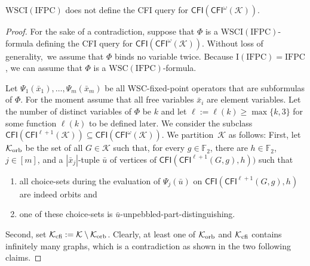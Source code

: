\documentclass[]{lmcs}
\newcommand{\FF}{\mathbb{F}}
\newcommand{\set}[1]{\lbrace #1 \rbrace}
\newcommand{\formA}{\Phi}
\newcommand{\formB}{\Psi}
\newcommand{\tup}[1]{\bar{#1}}
\newcommand{\vertA}{u}
\newcommand{\GraphClass}{\mathcal{K}}
\newcommand{\IFPC}{\ensuremath{\mathrm{IFPC}}}
\newcommand{\CFImsym}{\mathsf{CFI}^\omega}
\newcommand{\CFIm}[1]{\CFImsym(#1)}
\newcommand{\CFImk}[2]{\mathsf{CFI}^{#1}(#2)}
\newcommand{\WSCof}[1]{\mathrm{WSC}(#1)}
\newcommand{\Iof}[1]{\mathrm{I}(#1)}
\newcommand{\WSCIof}[1]{\mathrm{WSCI}(#1)}
\newcommand{\CFIsym}{\mathsf{CFI}}
\newcommand{\CFI}[1]{\CFIsym(#1)}
\begin{document}
\begin{lem}
	\label{lem:cfi-cfi-not-in-wsci}
	$\WSCIof{\IFPC}$ does not define the CFI query for $\CFI{\CFIm{\GraphClass}}$.
\end{lem}
\begin{proof}	
	For the sake of a contradiction, suppose that $\formA$ is a $\WSCIof{\IFPC}$-formula defining the CFI query for $\CFI{\CFIm{\GraphClass}}$.
	Without loss of generality,~we assume that $\formA$ binds no variable twice.
	Because $\Iof{\IFPC{}}=\IFPC{}$,
	we can assume that $\formA$ is a $\WSCof{\IFPC{}}$-formula.
	
	Let $\formB_1(\tup{x}_1), \dots, \formB_m(\tup{x}_m)$ be all WSC-fixed-point operators that are subformulas of $\formA$.
	For the moment assume that all free variables $\tup{x}_i$ are element variables.
	Let the number of distinct variables of $\formA$ be $k$
	and let $\ell := \ell(k) \geq \max\set{k,3}$ for some function $\ell(k)$ to be defined later.
	We consider the subclass $\CFI{\CFImk{\ell+1}{\GraphClass}} \subseteq \CFI{\CFIm{\GraphClass}}$.
	We partition~$\GraphClass$ as follows:
	First, let $\GraphClassOrb$ be the set of all $G \in \GraphClass$
	such that, for every $g \in \FF_2$, there are $h\in \FF_2$,  $j \in [m]$,
	and a $|\tup{x}_j|$-tuple $\tup{\vertA}$ of vertices of $\CFI{\CFImk{\ell+1}{G,g},h})$
	such that 
	\begin{enumerate}
		\item all choice-sets during the evaluation of $\formB_j(\tup{\vertA})$ on $\CFI{\CFImk{\ell+1}{G,g},h}$
		are indeed orbits and
		\item one of these choice-sets is $\tup{\vertA}$-unpebbled-part-distinguishing.
	\end{enumerate}
	Second, set $\GraphClassCFI := \GraphClass\setminus \GraphClassOrb$.
	Clearly, at least one of $\GraphClassOrb$ and $\GraphClassCFI$ contains infinitely many graphs, which is a contradiction as shown in the two following claims.
	

\end{proof}
\end{document}
